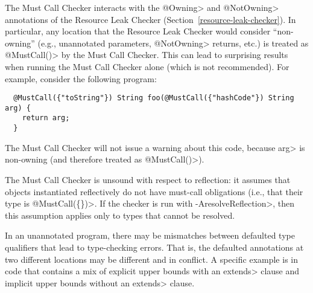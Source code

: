 



The Must Call Checker interacts with the \<@Owning> and \<@NotOwning> annotations of the
Resource Leak Checker (Section~\ref{resource-leak-checker}). In particular, any location that
the Resource Leak Checker would consider ``non-owning'' (e.g., unannotated parameters, \<@NotOwning>
returns, etc.) is treated as \<@MustCall({})> by the Must Call Checker. This can lead to surprising
results when running the Must Call Checker alone (which is not recommended). For example,
consider the following program:

\begin{Verbatim}
  @MustCall({"toString"}) String foo(@MustCall({"hashCode"}) String arg) {
    return arg;
  }
\end{Verbatim}

The Must Call Checker will not issue a warning about this code, because \<arg>
is non-owning (and therefore treated as \<@MustCall({})>).



The Must Call Checker is unsound with respect to reflection: it assumes
that objects instantiated reflectively do not have must-call obligations (i.e., that their
type is \<@MustCall(\{\})>. If the checker is run with \<-AresolveReflection>, then
this assumption applies only to types that cannot be resolved.



In an unannotated program, there may be mismatches between defaulted type
qualifiers that lead to type-checking errors.  That is, the defaulted
annotations at two different locations may be different and in conflict.  A
specific example is in code that contains a mix of explicit upper bounds
with an \<extends> clause and implicit upper bounds without an \<extends>
clause.

